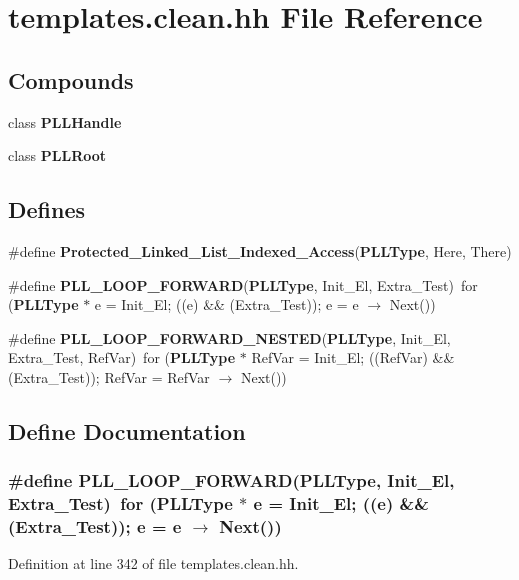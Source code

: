 \section{templates.clean.hh File Reference}
\label{templates_8clean_8hh}
\subsection*{Compounds}
\begin{CompactItemize}
\item 
class {\bf PLLHandle}
\item 
class {\bf PLLRoot}
\end{CompactItemize}
\subsection*{Defines}
\begin{CompactItemize}
\item 
\#define {\bf Protected\_\-Linked\_\-List\_\-Indexed\_\-Access}({\bf PLLType}, Here, There)
\item 
\#define {\bf PLL\_\-LOOP\_\-FORWARD}({\bf PLLType}, Init\_\-El, Extra\_\-Test)\ for ({\bf PLLType} $\ast$ e = Init\_\-El; ((e) \&\& (Extra\_\-Test)); e = e $\rightarrow$ Next())
\item 
\#define {\bf PLL\_\-LOOP\_\-FORWARD\_\-NESTED}({\bf PLLType}, Init\_\-El, Extra\_\-Test, Ref\-Var)\ for ({\bf PLLType} $\ast$ Ref\-Var = Init\_\-El; ((Ref\-Var) \&\& (Extra\_\-Test)); Ref\-Var = Ref\-Var $\rightarrow$ Next())
\end{CompactItemize}


\subsection{Define Documentation}
\subsubsection{\setlength{\rightskip}{0pt plus 5cm}\#define PLL\_\-LOOP\_\-FORWARD({\bf PLLType}, Init\_\-El, Extra\_\-Test)\ for ({\bf PLLType} $\ast$ e = Init\_\-El; ((e) \&\& (Extra\_\-Test)); e = e $\rightarrow$ Next())}\label{templates_8clean_8hh_a1}




Definition at line 342 of file templates.clean.hh.
